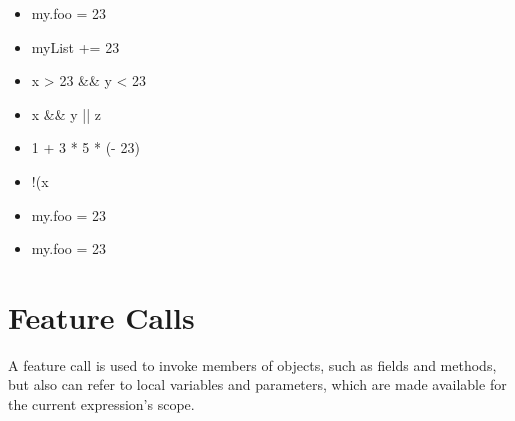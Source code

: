 \documentclass[a4paper,10pt]{scrreprt}
\newlength{\itemindentlen}
\begin{document}
\setlength{\itemindentlen}{\textwidth}
\begin{itemize}
\addtolength{\itemindentlen}{-2em}

\item \begin{minipage}[t]{\itemindentlen}
my.foo = 23
\end{minipage}

\item \begin{minipage}[t]{\itemindentlen}
myList += 23
\end{minipage}

\item \begin{minipage}[t]{\itemindentlen}
x > 23 \&\& y < 23
\end{minipage}

\item \begin{minipage}[t]{\itemindentlen}
x \&\& y || z
\end{minipage}

\item \begin{minipage}[t]{\itemindentlen}
1 + 3 * 5 * (- 23)
\end{minipage}

\item \begin{minipage}[t]{\itemindentlen}
!(x
\end{minipage}

\item \begin{minipage}[t]{\itemindentlen}
my.foo = 23
\end{minipage}

\item \begin{minipage}[t]{\itemindentlen}
my.foo = 23
\end{minipage}

\end{itemize}
\addtolength{\itemindentlen}{2em}







\section{Feature Calls}
\label{FeatureCalls}
A feature call is used to invoke members of objects, such as fields and methods, but also can refer to local variables and parameters, which are made available for the current expression's scope.
\end{document}
